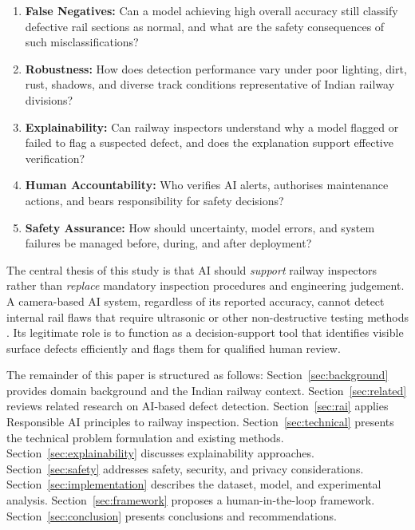 \documentclass[conference]{IEEE}
\begin{document}
\begin{enumerate}
    \item \textbf{False Negatives:} Can a model achieving high overall accuracy still classify defective rail sections as normal, and what are the safety consequences of such misclassifications?
    \item \textbf{Robustness:} How does detection performance vary under poor lighting, dirt, rust, shadows, and diverse track conditions representative of Indian railway divisions?
    \item \textbf{Explainability:} Can railway inspectors understand why a model flagged or failed to flag a suspected defect, and does the explanation support effective verification?
    \item \textbf{Human Accountability:} Who verifies AI alerts, authorises maintenance actions, and bears responsibility for safety decisions?
    \item \textbf{Safety Assurance:} How should uncertainty, model errors, and system failures be managed before, during, and after deployment?
\end{enumerate}

The central thesis of this study is that AI should \textit{support} railway inspectors rather than \textit{replace} mandatory inspection procedures and engineering judgement. A camera-based AI system, regardless of its reported accuracy, cannot detect internal rail flaws that require ultrasonic or other non-destructive testing methods \cite{rdso2020}. Its legitimate role is to function as a decision-support tool that identifies visible surface defects efficiently and flags them for qualified human review.

The remainder of this paper is structured as follows: Section~\ref{sec:background} provides domain background and the Indian railway context. Section~\ref{sec:related} reviews related research on AI-based defect detection. Section~\ref{sec:rai} applies Responsible AI principles to railway inspection. Section~\ref{sec:technical} presents the technical problem formulation and existing methods. Section~\ref{sec:explainability} discusses explainability approaches. Section~\ref{sec:safety} addresses safety, security, and privacy considerations. Section~\ref{sec:implementation} describes the dataset, model, and experimental analysis. Section~\ref{sec:framework} proposes a human-in-the-loop framework. Section~\ref{sec:conclusion} presents conclusions and recommendations.

\end{document}
